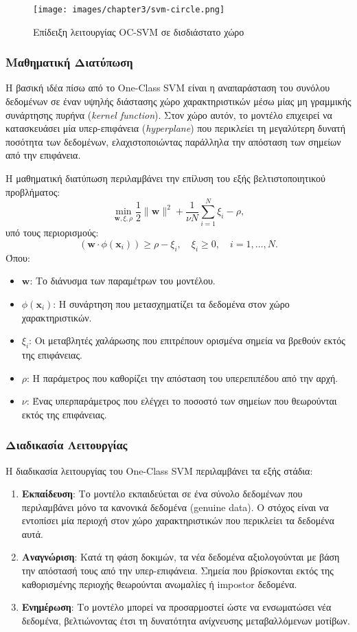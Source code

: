 \begin{figure}[H]
    \centering
    \texttt{[image: images/chapter3/svm-circle.png]}
    \caption{Επίδειξη λειτουργίας OC-SVM σε δισδιάστατο χώρο}
    \label{fig:chapter3_svmCircle}
\end{figure}

\subsubsection{Μαθηματική Διατύπωση}
Η βασική ιδέα πίσω από το One-Class SVM είναι η αναπαράσταση του συνόλου δεδομένων σε έναν υψηλής διάστασης χώρο χαρακτηριστικών μέσω μίας μη γραμμικής συνάρτησης πυρήνα (\textit{kernel function}). Στον χώρο αυτόν, το μοντέλο επιχειρεί να κατασκευάσει μία υπερ-επιφάνεια (\textit{hyperplane}) που περικλείει τη μεγαλύτερη δυνατή ποσότητα των δεδομένων, ελαχιστοποιώντας παράλληλα την απόσταση των σημείων από την επιφάνεια.

Η μαθηματική διατύπωση περιλαμβάνει την επίλυση του εξής βελτιστοποιητικού προβλήματος:
\[
\min_{\mathbf{w}, \xi, \rho} \frac{1}{2} \|\mathbf{w}\|^2 + \frac{1}{\nu N} \sum_{i=1}^N \xi_i - \rho,
\]
υπό τους περιορισμούς:
\[
(\mathbf{w} \cdot \phi(\mathbf{x}_i)) \geq \rho - \xi_i, \quad \xi_i \geq 0, \quad i = 1, \ldots, N.
\]
Όπου:
\begin{itemize}
    \item $\mathbf{w}$: Το διάνυσμα των παραμέτρων του μοντέλου.
    \item $\phi(\mathbf{x}_i)$: Η συνάρτηση που μετασχηματίζει τα δεδομένα στον χώρο χαρακτηριστικών.
    \item $\xi_i$: Οι μεταβλητές χαλάρωσης που επιτρέπουν ορισμένα σημεία να βρεθούν εκτός της επιφάνειας.
    \item $\rho$: Η παράμετρος που καθορίζει την απόσταση του υπερεπιπέδου από την αρχή.
    \item $\nu$: Ένας υπερπαράμετρος που ελέγχει το ποσοστό των σημείων που θεωρούνται εκτός της επιφάνειας.
\end{itemize}

\subsubsection{Διαδικασία Λειτουργίας}
Η διαδικασία λειτουργίας του One-Class SVM περιλαμβάνει τα εξής στάδια:
\begin{enumerate}
    \item \textbf{Εκπαίδευση}:
    Το μοντέλο εκπαιδεύεται σε ένα σύνολο δεδομένων που περιλαμβάνει μόνο τα κανονικά δεδομένα (genuine data). Ο στόχος είναι να εντοπίσει μία περιοχή στον χώρο χαρακτηριστικών που περικλείει τα δεδομένα αυτά.
    \item \textbf{Αναγνώριση}:
    Κατά τη φάση δοκιμών, τα νέα δεδομένα αξιολογούνται με βάση την απόστασή τους από την υπερ-επιφάνεια. Σημεία που βρίσκονται εκτός της καθορισμένης περιοχής θεωρούνται ανωμαλίες ή impostor δεδομένα.
    \item \textbf{Ενημέρωση}:
    Το μοντέλο μπορεί να προσαρμοστεί ώστε να ενσωματώσει νέα δεδομένα, βελτιώνοντας έτσι τη δυνατότητα ανίχνευσης μεταβαλλόμενων μοτίβων.
\end{enumerate}

